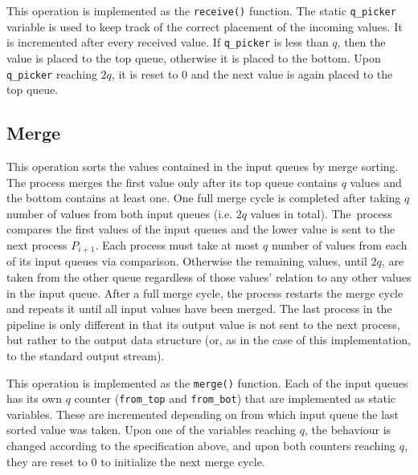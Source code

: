 \documentclass[pdftex, 11pt, a4paper, titlepage]{article}
\begin{document}
        This operation is implemented as the \texttt{receive()} function. The static \texttt{q\_picker} variable is used to keep track of
        the correct placement of the incoming values. It is incremented after every received value. If \texttt{q\_picker} is less than $q$,
        then the value is placed to the top queue, otherwise it is placed to the bottom. Upon \texttt{q\_picker} reaching $2q$, it is reset
        to 0 and the next value is again placed to the top queue.

        \subsection{Merge} \label{merge}
        This operation sorts the values contained in the input queues by merge sorting. The process merges the first value
        only after its top queue contains $q$ values and the bottom contains at least one. One full merge cycle is completed
        after taking $q$ number of values from both input queues (i.e. $2q$ values in total). The~process compares the first
        values of the input queues and the lower value is sent to the next process $P_{i+1}$. Each process must take
        at most $q$ number of values from each of its input queues via comparison. Otherwise the remaining values, until $2q$,
        are taken from the other queue regardless of those values' relation to any other values in the input queue.
        After a full merge cycle, the process restarts the merge cycle and repeats it until all input values have been merged.
        The last process in the pipeline is only different in that its output value is not sent to the next process, but rather
        to the output data structure (or, as in the case of this implementation, to the standard output stream).

        This operation is implemented as the \texttt{merge()} function. Each of the input queues has its own $q$ counter
        (\texttt{from\_top} and \texttt{from\_bot}) that are implemented as static variables. These are incremented depending on
        from which input queue the last sorted value was taken. Upon one of the variables reaching $q$, the behaviour is changed
        according to the specification above, and upon both counters reaching $q$, they are reset to $0$ to initialize
        the next merge cycle.
\end{document}
